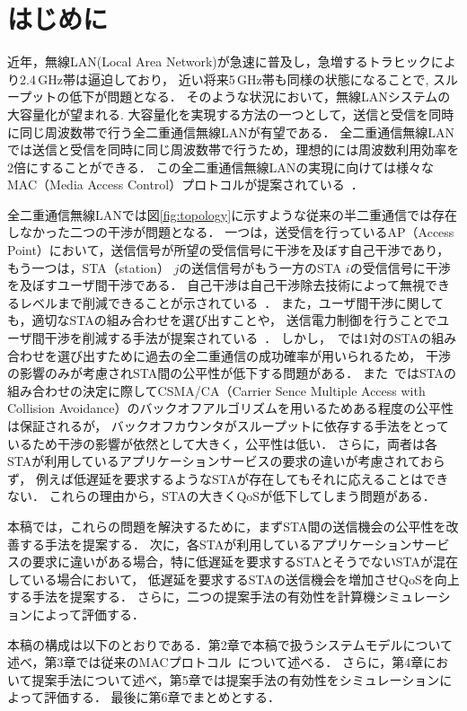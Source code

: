 \documentclass[technicalreport]{ieicej}
\begin{document}

\maketitle

\section{はじめに}
	近年，無線LAN(Local Area Network)が急速に普及し，急増するトラヒックにより2.4\,GHz帯は逼迫しており，
	近い将来5\,GHz帯も同様の状態になることで, スループットの低下が問題となる．
	そのような状況において，無線LANシステムの大容量化が望まれる.
	大容量化を実現する方法の一つとして，送信と受信を同時に同じ周波数帯で行う全二重通信無線LANが有望である．
	全二重通信無線LANでは送信と受信を同時に同じ周波数帯で行うため，理想的には周波数利用効率を2倍にすることができる．
	この全二重通信無線LANの実現に向けては様々なMAC（Media Access Control）プロトコルが提案されている~\cite{fdmac, goyal, janus, fdmac2, morif, fdmac3, fcts}．
	\par
	全二重通信無線LANでは図\ref{fig:topology}に示すような従来の半二重通信では存在しなかった二つの干渉が問題となる．
	一つは，送受信を行っているAP（Access Point）において，送信信号が所望の受信信号に干渉を及ぼす自己干渉であり，
	もう一つは，STA（station） $j$の送信信号がもう一方のSTA $i$の受信信号に干渉を及ぼすユーザ間干渉である．
	自己干渉は自己干渉除去技術によって無視できるレベルまで削減できることが示されている~\cite{fdmac, stanford1}．
	また，ユーザ間干渉に関しても，適切なSTAの組み合わせを選び出すことや，
	送信電力制御を行うことでユーザ間干渉を削減する手法が提案されている~\cite{contra, promac}．
	しかし，~\cite{contra}では1対のSTAの組み合わせを選び出すために過去の全二重通信の成功確率が用いられるため，
	干渉の影響のみが考慮されSTA間の公平性が低下する問題がある．
	また~\cite{promac}ではSTAの組み合わせの決定に際してCSMA/CA（Carrier Sence Multiple Access with Collision Avoidance）のバックオフアルゴリズムを用いるためある程度の公平性は保証されるが，
	バックオフカウンタがスループットに依存する手法をとっているため干渉の影響が依然として大きく，公平性は低い．
	さらに，両者は各STAが利用しているアプリケーションサービスの要求の違いが考慮されておらず，
	例えば低遅延を要求するようなSTAが存在してもそれに応えることはできない．
	これらの理由から，STAの大きくQoSが低下してしまう問題がある．
	\par
	本稿では，これらの問題を解決するために，まずSTA間の送信機会の公平性を改善する手法を提案する．
	次に，各STAが利用しているアプリケーションサービスの要求に違いがある場合，特に低遅延を要求するSTAとそうでないSTAが混在している場合において，
	低遅延を要求するSTAの送信機会を増加させQoSを向上する手法を提案する．
	さらに，二つの提案手法の有効性を計算機シミュレーションによって評価する．
	\par
	本稿の構成は以下のとおりである．第2章で本稿で扱うシステムモデルについて述べ，第3章では従来のMACプロトコル~\cite{promac}について述べる．
	さらに，第4章において提案手法について述べ，第5章では提案手法の有効性をシミュレーションによって評価する．
	最後に第6章でまとめとする．
\end{document}
